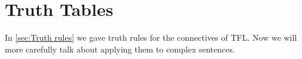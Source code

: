 %
%
%
%
%
%

\chapter{Truth Tables}
In \cref{sec:Truth rules} we gave truth rules for the connectives of TFL. Now we will more carefully talk about applying them to complex sentences. 

